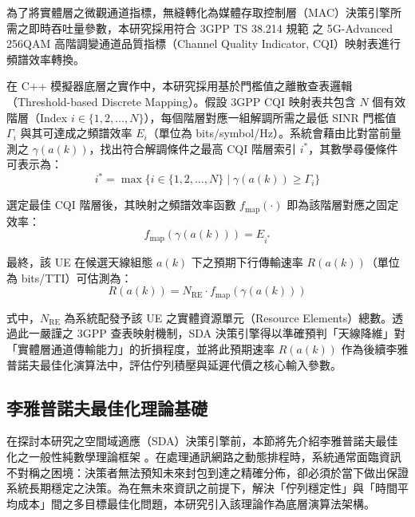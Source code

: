 為了將實體層之微觀通道指標，無縫轉化為媒體存取控制層（MAC）決策引擎所需之即時吞吐量參數，本研究採用符合 3GPP TS 38.214 規範 \cite{3gpp_ts38214} 之 5G-Advanced 256QAM 高階調變通道品質指標（Channel Quality Indicator, CQI）映射表進行頻譜效率轉換。

在 C++ 模擬器底層之實作中，本研究採用基於門檻值之離散查表邏輯（Threshold-based Discrete Mapping）。假設 3GPP CQI 映射表共包含 $N$ 個有效階層（Index $i \in \{1, 2, \dots, N\}$），每個階層對應一組解調所需之最低 SINR 門檻值 $\Gamma_i$ 與其可達成之頻譜效率 $E_i$（單位為 bits/symbol/Hz）。系統會藉由比對當前量測之 $\gamma(a(k))$，找出符合解調條件之最高 CQI 階層索引 $i^*$，其數學尋優條件可表示為：
\begin{equation}
i^* = \max \{ i \in \{1, 2, \dots, N\} \mid \gamma(a(k)) \geq \Gamma_i \}
\label{eq:cqi_index}
\end{equation}

選定最佳 CQI 階層後，其映射之頻譜效率函數 $f_{\text{map}}(\cdot)$ 即為該階層對應之固定效率：
\begin{equation}
f_{\text{map}}(\gamma(a(k))) = E_{i^*}
\label{eq:efficiency_mapping}
\end{equation}

最終，該 UE 在候選天線組態 $a(k)$ 下之預期下行傳輸速率 $R(a(k))$（單位為 bits/TTI）可估測為：
\begin{equation}
R(a(k)) = N_{\text{RE}} \cdot f_{\text{map}}(\gamma(a(k)))
\label{eq:expected_rate}
\end{equation}

式中，$N_{\text{RE}}$ 為系統配發予該 UE 之實體資源單元（Resource Elements）總數。透過此一嚴謹之 3GPP 查表映射機制，SDA 決策引擎得以準確預判「天線降維」對「實體層通道傳輸能力」的折損程度，並將此預期速率 $R(a(k))$ 作為後續李雅普諾夫最佳化演算法中，評估佇列積壓與延遲代價之核心輸入參數。



\subsection{李雅普諾夫最佳化理論基礎}
\label{sec:lyapunov_fundamentals}

在探討本研究之空間域適應（SDA）決策引擎前，本節將先介紹李雅普諾夫最佳化之一般性純數學理論框架 \cite{neely2010_stochastic}。在處理通訊網路之動態排程時，系統通常面臨資訊不對稱之困境：決策者無法預知未來封包到達之精確分佈，卻必須於當下做出保證系統長期穩定之決策。為在無未來資訊之前提下，解決「佇列穩定性」與「時間平均成本」間之多目標最佳化問題，本研究引入該理論作為底層演算法架構。

